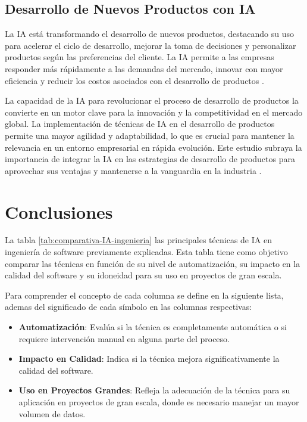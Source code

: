 \subsection{Desarrollo de Nuevos Productos con IA}

La IA está transformando el desarrollo de nuevos productos, destacando su uso para acelerar el ciclo de desarrollo, mejorar la toma de decisiones y personalizar productos según las preferencias del cliente. La IA permite a las empresas responder más rápidamente a las demandas del mercado, innovar con mayor eficiencia y reducir los costos asociados con el desarrollo de productos \cite{Cooper2024}.

La capacidad de la IA para revolucionar el proceso de desarrollo de productos la convierte en un motor clave para la innovación y la competitividad en el mercado global. La implementación de técnicas de IA en el desarrollo de productos permite una mayor agilidad y adaptabilidad, lo que es crucial para mantener la relevancia en un entorno empresarial en rápida evolución. Este estudio subraya la importancia de integrar la IA en las estrategias de desarrollo de productos para aprovechar sus ventajas y mantenerse a la vanguardia en la industria \cite{Cooper2024}.

\section{Conclusiones}

La tabla \ref{tab:comparativa-IA-ingenieria} las principales técnicas de IA en ingeniería de software previamente explicadas. Esta tabla tiene como objetivo comparar las técnicas en función de su nivel de automatización, su impacto en la calidad del software y su idoneidad para su uso en proyectos de gran escala.

Para comprender el concepto de cada columna se define en la siguiente lista, ademas del significado de cada símbolo en las columnas respectivas:

\begin{itemize}
	\item \textbf{Automatización}: Evalúa si la técnica es completamente automática o si requiere intervención manual en alguna parte del proceso.
	\item \textbf{Impacto en Calidad}: Indica si la técnica mejora significativamente la calidad del software.
	\item \textbf{Uso en Proyectos Grandes}: Refleja la adecuación de la técnica para su aplicación en proyectos de gran escala, donde es necesario manejar un mayor volumen de datos.
\end{itemize}


